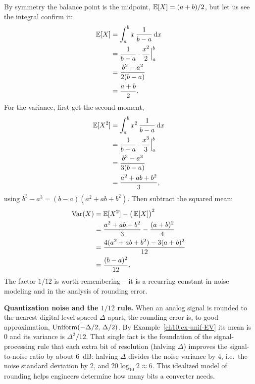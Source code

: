 \begin{example}
\label{ch10:ex-unif-EV}
By symmetry the balance point is the midpoint, $\operatorname{\mathbb{E}}[X] = (a+b)/2$, but let us see the
integral confirm it:
\begin{align*}
  \operatorname{\mathbb{E}}[X] &= \int_a^b x\,\frac{1}{b-a}\,\mathrm{d} x \\
        &= \frac{1}{b-a}\cdot \frac{x^2}{2}\Big|_a^b \\
        &= \frac{b^2-a^2}{2(b-a)} \\
        &= \frac{a+b}{2}.
\end{align*}
For the variance, first get the second moment,
\begin{align*}
  \operatorname{\mathbb{E}}[X^2] &= \int_a^b x^2\,\frac{1}{b-a}\,\mathrm{d} x \\
          &= \frac{1}{b-a}\cdot \frac{x^3}{3}\Big|_a^b \\
          &= \frac{b^3-a^3}{3(b-a)} \\
          &= \frac{a^2+ab+b^2}{3},
\end{align*}
using $b^3-a^3 = (b-a)(a^2+ab+b^2)$. Then subtract the squared mean:
\begin{align*}
  \operatorname{Var}(X) &= \operatorname{\mathbb{E}}[X^2] - \big(\operatorname{\mathbb{E}}[X]\big)^2 \\
          &= \frac{a^2+ab+b^2}{3} - \frac{(a+b)^2}{4} \\
          &= \frac{4(a^2+ab+b^2) - 3(a+b)^2}{12} \\
          &= \frac{(b-a)^2}{12}.
\end{align*}
The factor $1/12$ is worth remembering -- it is a recurring constant in noise
modeling and in the analysis of rounding error.
\end{example}

\begin{applicationbox}
\textbf{Quantization noise and the $1/12$ rule.} When an analog signal is rounded
to the nearest digital level spaced $\Delta$ apart, the rounding error is, to good
approximation, $\operatorname{Uniform}(-\Delta/2,\,\Delta/2)$. By Example~\ref{ch10:ex-unif-EV} its
mean is $0$ and its variance is $\Delta^2/12$. That single fact is the foundation of
the signal-processing rule that each extra bit of resolution (halving $\Delta$)
improves the signal-to-noise ratio by about $6$~dB: halving $\Delta$ divides the
noise variance by $4$, i.e.\ the noise standard deviation by $2$, and
$20\log_{10}2 \approx 6$. This idealized model of rounding helps engineers determine
how many bits a converter needs.
\end{applicationbox}

